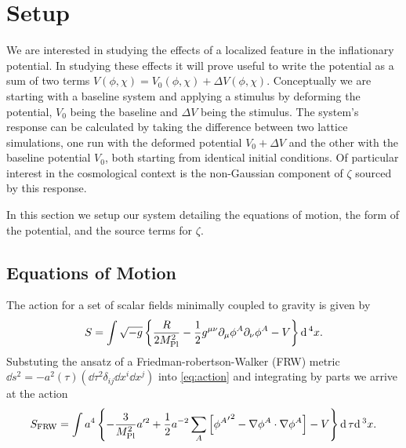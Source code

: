 
\section{Setup} \label{sec:setup}
We are interested in studying the effects of a localized feature in the inflationary potential.
In studying these effects it will prove useful to write the potential as a sum of two terms $V(\phi,\chi) = V_0(\phi,\chi) + \Delta V(\phi,\chi)$.
Conceptually we are starting with a baseline system and applying a stimulus by deforming the potential, $V_0$ being the baseline and $\Delta V$ being the stimulus.
The system's response can be calculated by taking the difference between two lattice simulations, one run with the deformed potential $V_0+\Delta V$ and the other with the baseline potential $V_0$, both starting from identical initial conditions.
Of particular interest in the cosmological context is the non-Gaussian component of $\zeta$ sourced by this response.

In this section we setup our system detailing the equations of motion, the form of the potential, and the source terms for $\zeta$.

\subsection{Equations of Motion}

The action for a set of scalar fields minimally coupled to gravity is given by
\begin{equation} \label{eq:action}
  S = \int \sqrt{-g}\left\{\frac{R}{2M_{\mathrm{Pl}}^2} - \frac{1}{2}g^{\mu\nu}\partial_\mu\phi^A\partial_\nu\phi^A - V \right\}\mathrm{d}\,^4x.
\end{equation} 
Substuting the ansatz of a Friedman-robertson-Walker (FRW) metric $\dd s^2 = -a^2(\tau)\left( \dd\tau^2 \delta_{ij}\dd x^i\dd x^j \right)$ into \eqref{eq:action} and integrating by parts we arrive at the action
\begin{equation} \label{eq:actionFRW}
  S_{\mathrm{FRW}} = \int a^4\left\{
  - \frac{3}{M_{\mathrm{Pl}}^2}a'^2
  + \frac{1}{2}a^{-2}\sum_A\left[{{\phi^A}'}^2
  - \nabla\phi^A\cdot\nabla\phi^A\right]
  - V
  \right\}\mathrm{d}\,\tau\mathrm{d}\,^3x.
\end{equation}

